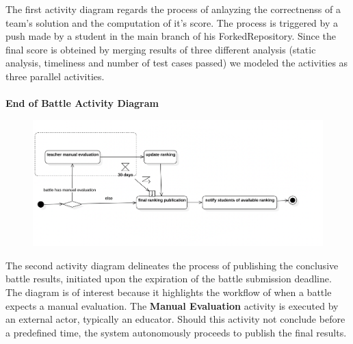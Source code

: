 The first activity diagram regards the process of anlayzing the correctnenss of a team's solution and the computation of it's score. The process is triggered by a push made by a student in the main branch of his ForkedRepository. Since the final score is obteined by merging results of three different analysis (static analysis, timeliness and number of test cases passed) we modeled the activities as three parallel activities.\\
\\
\newpage
\textbf{End of Battle Activity Diagram}\\
\begin{figure}[h]
    \centering
    \includegraphics[width=1\textwidth]{RASD/2Overall_Description/res/ActivityDiagramEndBattle.png}
\end{figure}

The second activity diagram delineates the process of publishing the conclusive battle results, initiated upon the expiration of the battle submission deadline. The diagram is of interest because it highlights the workflow of when a battle expects a manual evaluation. The  \textbf{Manual Evaluation} activity is executed by an external actor, typically an educator. Should this activity not conclude before a predefined time, the system autonomously proceeds to publish the final results.
